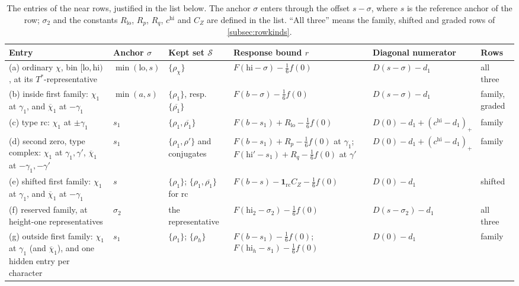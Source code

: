 \documentclass[11pt]{amsart}
\numberwithin{equation}{section}
\theoremstyle{plain}
\theoremstyle{definition}
\theoremstyle{remark}
\newcommand{\cS}{\mathcal{S}}
\newcommand{\lo}{\mathrm{lo}}
\newcommand{\hi}{\mathrm{hi}}
\newcommand{\1}{\mathbf{1}}
\newcommand{\bchi}{\overline{\chi}}
\begin{document}
\begin{table}[ht]
\centering
\footnotesize
\setlength{\tabcolsep}{3.5pt}
\renewcommand{\arraystretch}{1.3}
\begin{tabular}{@{}>{\raggedright\arraybackslash}p{3.45cm}>{\centering\arraybackslash}p{1.35cm}
  >{\centering\arraybackslash}p{1.75cm}>{\centering\arraybackslash}p{3.2cm}
  >{\centering\arraybackslash}p{2.35cm}>{\raggedright\arraybackslash}p{1.65cm}@{}}
\toprule
Entry & Anchor $\sigma$ & Kept set $\cS$ & Response bound $r$ & Diagonal numerator & Rows\\
\midrule
(a) ordinary $\chi$, bin $[\lo,\hi)$, at its $T^*$-representative & $\min(\lo,s)$ & $\{\rho_\chi\}$ &
  $F(\hi-\sigma)-\frac16f(0)$ & $D(s-\sigma)-d_1$ & all three\\
(b) inside first family: $\chi_1$ at $\gamma_1$, and $\bchi_1$ at $-\gamma_1$ & $\min(a,s)$ &
  $\{\rho_1\}$, resp.\ $\{\overline{\rho_1}\}$ & $F(b-\sigma)-\frac16f(0)$ & $D(s-\sigma)-d_1$ & family, graded\\
(c) type $\mathrm{rc}$: $\chi_1$ at $\pm\gamma_1$ & $s_1$ & $\{\rho_1,\overline{\rho_1}\}$ &
  $F(b-s_1)+R_{\lo}-\frac16f(0)$ & $D(0)-d_1+(c^{\hi}-d_1)_+$ & family\\
(d) second zero, type $\mathrm{complex}$: $\chi_1$ at $\gamma_1,\gamma'$, $\bchi_1$ at $-\gamma_1,-\gamma'$ &
  $s_1$ & $\{\rho_1,\rho'\}$ and conjugates & $F(b-s_1)+R_p-\frac16f(0)$ at $\gamma_1$;
  $F(\hi'-s_1)+R_q-\frac16f(0)$ at $\gamma'$ & $D(0)-d_1+(c^{\hi}-d_1)_+$ & family\\
(e) shifted first family: $\chi_1$ at $\gamma_1$, and $\bchi_1$ at $-\gamma_1$ & $s$ &
  $\{\rho_1\}$; $\{\rho_1,\overline{\rho_1}\}$ for $\mathrm{rc}$ & $F(b-s)-\1_{\mathrm{rc}}C_Z-\frac16f(0)$ &
  $D(0)-d_1$ & shifted\\
(f) reserved family, at height-one representatives & $\sigma_2$ & the representative &
  $F(\hi_2-\sigma_2)-\frac16f(0)$ & $D(s-\sigma_2)-d_1$ & all three\\
(g) outside first family: $\chi_1$ at $\gamma_1$ (and $\bchi_1$), and one hidden entry per character &
  $s_1$ & $\{\rho_1\}$; $\{\rho_h\}$ & $F(b-s_1)-\frac16f(0)$; $F(\hi_h-s_1)-\frac16f(0)$ & $D(0)-d_1$ &
  family\\
\bottomrule
\end{tabular}
\caption{The entries of the near rows, justified in the list below. The anchor $\sigma$ enters
through the offset $s-\sigma$, where $s$ is the reference anchor of the row; $\sigma_2$ and the
constants $R_{\lo}$, $R_p$, $R_q$, $c^{\hi}$ and $C_Z$ are defined in the list. ``All three'' means
the family, shifted and graded rows of \cref{subsec:rowkinds}.}
\label{tab:entries}
\end{table}
\end{document}
